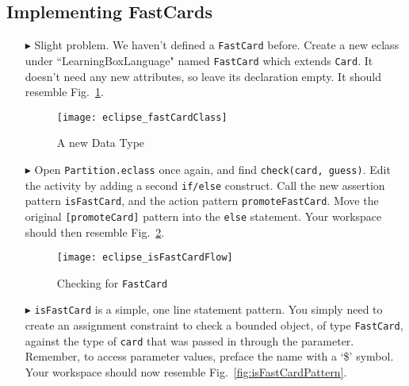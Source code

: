 \newpage
\subsection{Implementing FastCards}
\texHeader
\hypertarget{fastCard tex}{}

\begin{itemize}
  
\item[$\blacktriangleright$] Slight problem. We haven't defined a \texttt{FastCard} before. Create a new eclass under ``LearningBoxLanguage" named
\texttt{FastCard} which extends \texttt{Card}. It doesn't need any new attributes, so leave its declaration empty. It should resemble Fig.~\ref{fig:fastClass}.

\vspace{0.5cm}

\begin{figure}[htp]
\begin{center}
  \texttt{[image: eclipse\_fastCardClass]}
  \caption{A new Data Type}
  \label{fig:fastClass}
\end{center}
\end{figure}

\item[$\blacktriangleright$] Open \texttt{Partition.eclass} once again, and find \texttt{check(card, guess)}. Edit the activity by adding a second
\texttt{if/else} construct. Call the new assertion pattern \texttt{isFastCard}, and the action pattern \texttt{promoteFastCard}. Move the original
\texttt{[promoteCard]} pattern into the \texttt{else} statement. Your workspace should then resemble Fig.~\ref{fig:isFastCard}.

\vspace{0.5cm}

\begin{figure}[htp]
\begin{center}
  \texttt{[image: eclipse\_isFastCardFlow]}
  \caption{Checking for \texttt{FastCard}}
  \label{fig:isFastCard}
\end{center}
\end{figure}

\item[$\blacktriangleright$] \texttt{isFastCard} is a simple, one line statement pattern. You simply need to create an assignment constraint to check a bounded
object, of type \texttt{FastCard}, against the type of \texttt{card} that was passed in through the parameter. Remember, to access parameter values, preface
the name with a `\$' symbol. Your workspace should now resemble Fig.~\ref{fig:isFastCardPattern}.


\end{itemize}
